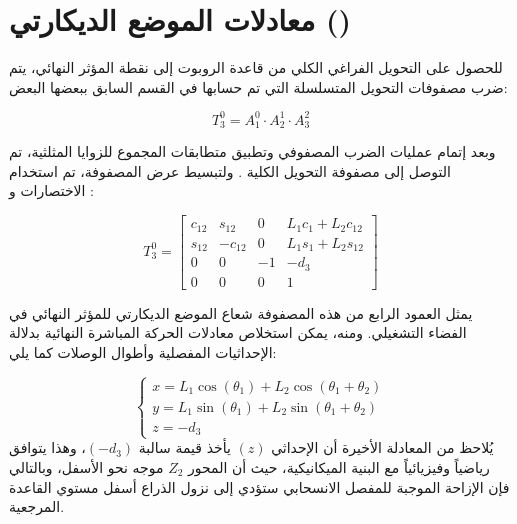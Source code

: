 \section{معادلات الموضع الديكارتي ()}
\label{sec:position}

للحصول على التحويل الفراغي الكلي من قاعدة الروبوت إلى نقطة المؤثر النهائي، يتم ضرب مصفوفات التحويل المتسلسلة التي تم حسابها في القسم السابق ببعضها البعض:

\begin{equation}
T_3^0 = A_1^0 \cdot A_2^1 \cdot A_3^2
\end{equation}

وبعد إتمام عمليات الضرب المصفوفي وتطبيق متطابقات المجموع للزوايا المثلثية، تم التوصل إلى مصفوفة التحويل الكلية . ولتبسيط عرض المصفوفة، تم استخدام الاختصارات  و :

\begin{equation}
T_3^0 = 
\begin{bmatrix}
c_{12} & s_{12} & 0 & L_1 c_1 + L_2 c_{12} \\
s_{12} & -c_{12} & 0 & L_1 s_1 + L_2 s_{12} \\
0 & 0 & -1 & -d_3 \\
0 & 0 & 0 & 1
\end{bmatrix}
\end{equation}

يمثل العمود الرابع من هذه المصفوفة شعاع الموضع الديكارتي للمؤثر النهائي في الفضاء التشغيلي. ومنه، يمكن استخلاص معادلات الحركة المباشرة النهائية  بدلالة الإحداثيات المفصلية  وأطوال الوصلات  كما يلي:

\begin{equation}
\begin{cases}
x = L_1 \cos(\theta_1) + L_2 \cos(\theta_1 + \theta_2) \\
y = L_1 \sin(\theta_1) + L_2 \sin(\theta_1 + \theta_2) \\
z = -d_3
\end{cases}
\label{eq:fk_position}
\end{equation}
يُلاحظ من المعادلة الأخيرة أن الإحداثي $(z)$ يأخذ قيمة سالبة $(-d_3)$، وهذا يتوافق رياضياً وفيزيائياً مع البنية الميكانيكية، حيث أن المحور $Z_2$ موجه نحو الأسفل، وبالتالي فإن الإزاحة الموجبة للمفصل الانسحابي ستؤدي إلى نزول الذراع أسفل مستوي القاعدة المرجعية.
